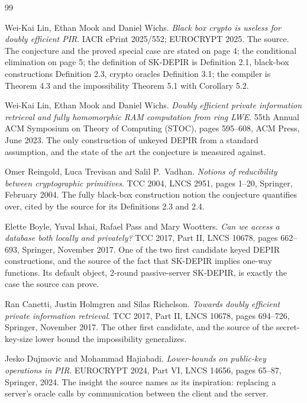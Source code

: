 \documentclass{conjura-conjecture}
\begin{document}
\begin{conjurabibliography}{99}

Wei-Kai Lin, Ethan Mook and Daniel Wichs.
\emph{Black box crypto is useless for doubly efficient PIR}.
IACR ePrint 2025/552; EUROCRYPT 2025.
The source. The conjecture and the proved special case are stated on
page 4; the conditional elimination on page 5; the definition of
SK-DEPIR is Definition 2.1, black-box constructions Definition 2.3,
crypto oracles Definition 3.1; the compiler is Theorem 4.3 and the
impossibility Theorem 5.1 with Corollary 5.2.

Wei-Kai Lin, Ethan Mook and Daniel Wichs.
\emph{Doubly efficient private information retrieval and fully
homomorphic RAM computation from ring LWE}.
55th Annual ACM Symposium on Theory of Computing (STOC), pages 595--608,
ACM Press, June 2023.
The only construction of unkeyed DEPIR from a standard assumption, and
the state of the art the conjecture is measured against.

Omer Reingold, Luca Trevisan and Salil P.\ Vadhan.
\emph{Notions of reducibility between cryptographic primitives}.
TCC 2004, LNCS 2951, pages 1--20, Springer, February 2004.
The fully black-box construction notion the conjecture quantifies over,
cited by the source for its Definitions 2.3 and 2.4.

Elette Boyle, Yuval Ishai, Rafael Pass and Mary Wootters.
\emph{Can we access a database both locally and privately?}
TCC 2017, Part II, LNCS 10678, pages 662--693, Springer, November 2017.
One of the two first candidate keyed DEPIR constructions, and the source
of the fact that SK-DEPIR implies one-way functions. Its default object,
2-round passive-server SK-DEPIR, is exactly the case the source can prove.

Ran Canetti, Justin Holmgren and Silas Richelson.
\emph{Towards doubly efficient private information retrieval}.
TCC 2017, Part II, LNCS 10678, pages 694--726, Springer, November 2017.
The other first candidate, and the source of the secret-key-size
lower bound the impossibility generalizes.

Jesko Dujmovic and Mohammad Hajiabadi.
\emph{Lower-bounds on public-key operations in PIR}.
EUROCRYPT 2024, Part VI, LNCS 14656, pages 65--87, Springer, 2024.
The insight the source names as its inspiration: replacing a server's
oracle calls by communication between the client and the server.

\end{conjurabibliography}
\end{document}
